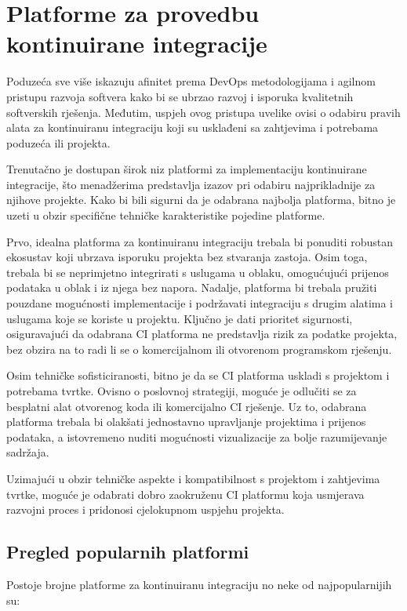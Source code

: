 \documentclass[a4paper,12pt,oneside]{article}
\begin{document}
\newpage

\section{Platforme za provedbu kontinuirane integracije}

 Poduzeća sve više iskazuju afinitet prema DevOps metodologijama i agilnom pristupu razvoja softvera kako bi se ubrzao razvoj i isporuka kvalitetnih softverskih rješenja. Međutim, uspjeh ovog pristupa uvelike ovisi o odabiru pravih alata za kontinuiranu integraciju koji su usklađeni sa zahtjevima i potrebama poduzeća ili projekta.

Trenutačno je dostupan širok niz platformi za implementaciju kontinuirane integracije, što menadžerima predstavlja izazov pri odabiru najprikladnije za njihove projekte. Kako bi bili sigurni da je odabrana najbolja platforma, bitno je uzeti u obzir specifične tehničke karakteristike pojedine platforme.

Prvo, idealna platforma za kontinuiranu integraciju trebala bi ponuditi robustan ekosustav koji ubrzava isporuku projekta bez stvaranja zastoja. Osim toga, trebala bi se neprimjetno integrirati s uslugama u oblaku, omogućujući prijenos podataka u oblak i iz njega bez napora. Nadalje, platforma bi trebala pružiti pouzdane mogućnosti implementacije i podržavati integraciju s drugim alatima i uslugama koje se koriste u projektu. Ključno je dati prioritet sigurnosti, osiguravajući da odabrana CI platforma ne predstavlja rizik za podatke projekta, bez obzira na to radi li se o komercijalnom ili otvorenom programskom rješenju.

Osim tehničke sofisticiranosti, bitno je da se CI platforma uskladi s projektom i potrebama tvrtke. Ovisno o poslovnoj strategiji, moguće je odlučiti se za besplatni alat otvorenog koda ili komercijalno CI rješenje. Uz to, odabrana platforma trebala bi olakšati jednostavno upravljanje projektima i prijenos podataka, a istovremeno nuditi mogućnosti vizualizacije za bolje razumijevanje sadržaja.

Uzimajući u obzir tehničke aspekte i kompatibilnost s projektom i zahtjevima tvrtke, moguće je odabrati dobro zaokruženu CI platformu koja usmjerava razvojni proces i pridonosi cjelokupnom uspjehu projekta.

\newpage

\subsection{Pregled popularnih platformi}
Postoje brojne platforme za kontinuiranu integraciju no neke od najpopularnijih su:
\end{document}
